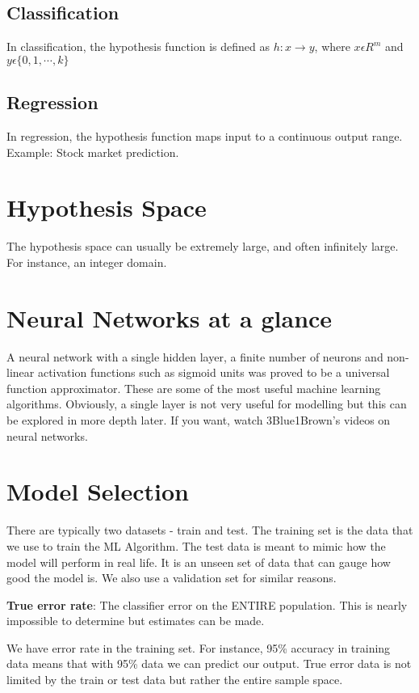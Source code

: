 \subsection{Classification}

In classification, the hypothesis function is defined as $h: x \to y$, where $x \epsilon R^m$ and $y \epsilon \{0,1,\cdots ,k\}$

\subsection{Regression}

In regression, the hypothesis function maps input to a continuous output range. Example: Stock market prediction.

\section{Hypothesis Space}
The hypothesis space can usually be extremely large, and often infinitely large. For instance, an integer domain. 


\section{Neural Networks at a glance}
A neural network with a single hidden layer, a finite number of neurons and non-linear activation functions such as sigmoid units was proved to be a universal function approximator. These are some of the most useful machine learning algorithms. Obviously, a single layer is not very useful for modelling but this can be explored in more depth later. If you want, watch 3Blue1Brown's videos on neural networks.

\section{Model Selection}

There are typically two datasets - train and test. The training set is the data that we use to train the ML Algorithm. The test data is meant to mimic how the model will perform in real life. It is an unseen set of data that can gauge how good the model is. We also use a validation set for similar reasons.

\textbf{True error rate}: The classifier error on the ENTIRE population. This is nearly impossible to determine but estimates can be made.

We have error rate in the training set. For instance, 95\% accuracy in training data means that with 95\% data we can predict our output. True error data is not limited by the train or test data but rather the entire sample space.

